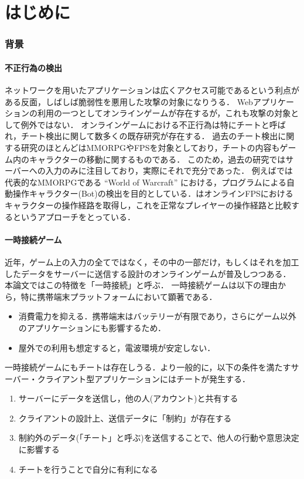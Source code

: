 \part{はじめに}
\section{背景}
\subsection{不正行為の検出}
ネットワークを用いたアプリケーションは広くアクセス可能であるという利点がある反面，しばしば脆弱性を悪用した攻撃の対象になりうる．
Webアプリケーションの利用の一つとしてオンラインゲームが存在するが，これも攻撃の対象として例外ではない．
オンラインゲームにおける不正行為は特にチートと呼ばれ，チート検出に関して数多くの既存研究が存在する．
過去のチート検出に関する研究のほとんどはMMORPGやFPSを対象としており，チートの内容もゲーム内のキャラクターの移動に関するものである．
このため，過去の研究ではサーバーへの入力のみに注目しており，実際にそれで充分であった．
例えば\cite{botcraft}では代表的なMMORPGである ``World of Warcraft'' における，プログラムによる自動操作キャラクター(Bot)の検出を目的としている．\cite{gamefps}はオンラインFPSにおけるキャラクターの操作経路を取得し，これを正常なプレイヤーの操作経路と比較するというアプローチをとっている．

\subsection{一時接続ゲーム}
近年，ゲーム上の入力の全てではなく，その中の一部だけ，もしくはそれを加工したデータをサーバーに送信する設計のオンラインゲームが普及しつつある．
本論文ではこの特徴を「一時接続」と呼ぶ．
一時接続ゲームは以下の理由から，特に携帯端末プラットフォームにおいて顕著である．

\begin{itemize}
\item
消費電力を抑える．携帯端末はバッテリーが有限であり，さらにゲーム以外のアプリケーションにも影響するため．
\item
屋外での利用も想定すると，電波環境が安定しない．
\end{itemize}

一時接続ゲームにもチートは存在しうる．より一般的に，以下の条件を満たすサーバー・クライアント型アプリケーションにはチートが発生する．

\begin{enumerate}
\item
サーバーにデータを送信し，他の人(アカウント)と共有する
\item
クライアントの設計上、送信データに「制約」が存在する
\item
制約外のデータ(「チート」と呼ぶ)を送信することで、他人の行動や意思決定に影響する
\item
チートを行うことで自分に有利になる
\end{enumerate}

